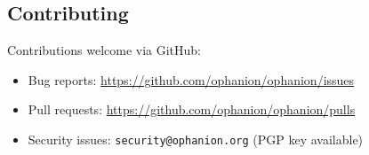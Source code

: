 \documentclass[11pt,a4paper]{article}
\begin{document}
\subsection{Contributing}

Contributions welcome via GitHub:
\begin{itemize}
\item Bug reports: \url{https://github.com/ophanion/ophanion/issues}
\item Pull requests: \url{https://github.com/ophanion/ophanion/pulls}
\item Security issues: \texttt{security@ophanion.org} (PGP key available)
\end{itemize}
\end{document}
